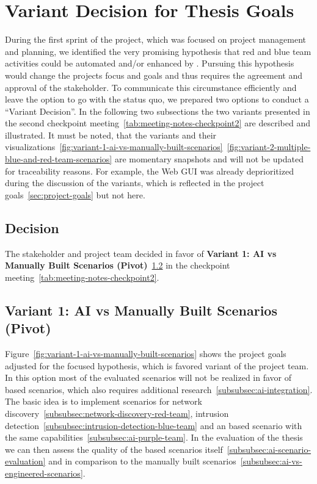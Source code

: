 
\newpage
\section{Variant Decision for Thesis Goals}\label{sec:variant-decisions-for-thesis-goals}

During the first sprint of the project, which was focused on project management and planning,
we identified the very promising hypothesis that red and blue team activities could be automated and/or enhanced by .
Pursuing this hypothesis would change the projects focus and goals and thus requires the agreement and approval of the stakeholder.
To communicate this circumstance efficiently and leave the option to go with the status quo, we prepared two options to conduct a \enquote{Variant Decision}.
In the following two subsections the two variants presented in the second checkpoint meeting~\ref{tab:meeting-notes-checkpoint2} are described and illustrated.
It must be noted, that the variants and their visualizations~\ref{fig:variant-1-ai-vs-manually-built-scenarios}~\ref{fig:variant-2-multiple-blue-and-red-team-scenarios} are momentary snapshots and will not be updated for traceability reasons.
For example, the Web GUI was already deprioritized during the discussion of the variants, which is reflected in the project goals~\ref{sec:project-goals} but not here.

\subsection{Decision}\label{subsec:variant-decision-for-thesis-goals-decisions}

The stakeholder and project team decided in favor of \textbf{Variant 1: AI vs Manually Built Scenarios (Pivot)}~\ref{subsec:variant-1-ai-vs-manually-built-scenarios} in the checkpoint meeting~\ref{tab:meeting-notes-checkpoint2}.

\subsection{Variant 1: AI vs Manually Built Scenarios (Pivot)}\label{subsec:variant-1-ai-vs-manually-built-scenarios}

Figure~\ref{fig:variant-1-ai-vs-manually-built-scenarios} shows the project goals adjusted for the  focused hypothesis, which is favored variant of the project team.
In this option most of the evaluated scenarios will not be realized in favor of  based scenarios, which also requires additional research~\ref{subsubsec:ai-integration}.
The basic idea is to implement scenarios for network discovery~\ref{subsubsec:network-discovery-red-team}, intrusion detection~\ref{subsubsec:intrusion-detection-blue-team} and an  based scenario with the same capabilities~\ref{subsubsec:ai-purple-team}.
In the evaluation of the thesis we can then assess the quality of the  based scenarios itself~\ref{subsubsec:ai-scenario-evaluation} and in comparison to the manually built scenarios~\ref{subsubsec:ai-vs-engineered-scenarios}.

